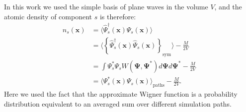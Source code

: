 \documentclass[aps,prl,twocolumn,showpacs,amsmath,amssymb,superscriptaddress,flushbottom,noraggedfooter]{revtex4-1}
\newcommand{\xvec}{\boldsymbol{x}}
\newcommand{\Psivec}{\boldsymbol{\Psi}}
\begin{document}
In this work we used the simple basis of plane waves in the volume $V$,
and the atomic density of component $s$ is therefore:
\begin{equation}
\begin{split}
n_{s} (\xvec) & =
\langle \widehat{\Psi}^\dagger_{s} (\xvec) \widehat{\Psi}_{s} (\xvec) \rangle \\
& = \langle \left\{ \widehat{\Psi}^\dagger_{s} (\xvec)
	\widehat{\Psi}_{s} (\xvec) \right\}_{\mathrm{sym}} \rangle - \frac{M}{2V} \\
& = \int \Psi^*_{s} \Psi_{s} W(\Psivec, \Psivec^*) d\Psivec d\Psivec^* - \frac{M}{2V} \\
& = \langle \Psi^*_{s} (\xvec) \Psi_{s} (\xvec) \rangle_{\mathrm{paths}} - \frac{M}{2V}.
\end{split}
\end{equation}
Here we used the fact that the approximate Wigner function is a probability distribution
equivalent to an averaged sum over different simulation paths.
\end{document}
